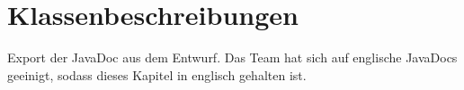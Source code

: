 \chapter{Klassenbeschreibungen}
\label{ch:klassenbeschreibungen}

Export der JavaDoc aus dem Entwurf. Das Team hat sich auf englische JavaDocs geeinigt, sodass dieses Kapitel in englisch gehalten ist.













